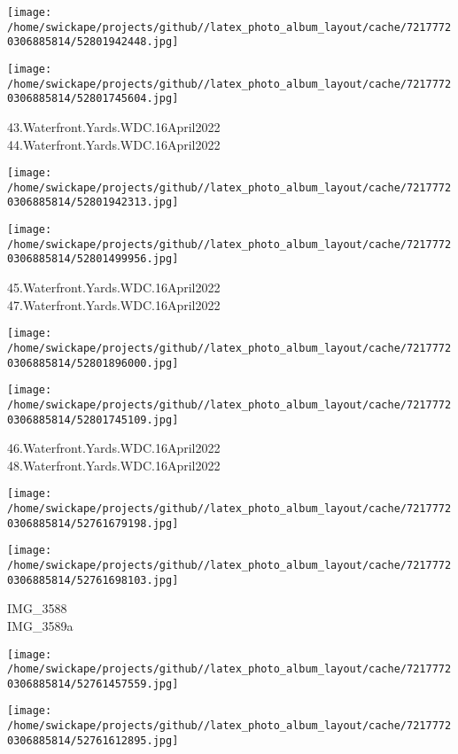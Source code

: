 \documentclass[10pt,letterpaper]{article}
\begin{document}
\texttt{[image: /home/swickape/projects/github//latex\_photo\_album\_layout/cache/72177720306885814/52801942448.jpg]}

\vspace{0.25in}
\texttt{[image: /home/swickape/projects/github//latex\_photo\_album\_layout/cache/72177720306885814/52801745604.jpg]}

43.Waterfront.Yards.WDC.16April2022\\
44.Waterfront.Yards.WDC.16April2022
\pagebreak

\texttt{[image: /home/swickape/projects/github//latex\_photo\_album\_layout/cache/72177720306885814/52801942313.jpg]}

\vspace{0.25in}
\texttt{[image: /home/swickape/projects/github//latex\_photo\_album\_layout/cache/72177720306885814/52801499956.jpg]}

45.Waterfront.Yards.WDC.16April2022\\
47.Waterfront.Yards.WDC.16April2022
\pagebreak

\texttt{[image: /home/swickape/projects/github//latex\_photo\_album\_layout/cache/72177720306885814/52801896000.jpg]}

\vspace{0.25in}
\texttt{[image: /home/swickape/projects/github//latex\_photo\_album\_layout/cache/72177720306885814/52801745109.jpg]}

46.Waterfront.Yards.WDC.16April2022\\
48.Waterfront.Yards.WDC.16April2022
\pagebreak

\texttt{[image: /home/swickape/projects/github//latex\_photo\_album\_layout/cache/72177720306885814/52761679198.jpg]}

\vspace{0.25in}
\texttt{[image: /home/swickape/projects/github//latex\_photo\_album\_layout/cache/72177720306885814/52761698103.jpg]}

IMG\_3588\\
IMG\_3589a
\pagebreak

\texttt{[image: /home/swickape/projects/github//latex\_photo\_album\_layout/cache/72177720306885814/52761457559.jpg]}

\vspace{0.25in}
\texttt{[image: /home/swickape/projects/github//latex\_photo\_album\_layout/cache/72177720306885814/52761612895.jpg]}
\end{document}
